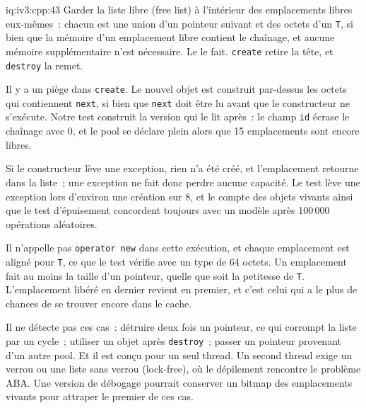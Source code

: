 \begin{solution}{iq:iv3:cpp:43}
Garder la liste libre (free list) à l'intérieur des emplacements libres eux-mêmes~: chacun est une union d'un pointeur suivant et des octets d'un \texttt{T}, si bien que la mémoire d'un emplacement libre contient le chaînage, et aucune mémoire supplémentaire n'est nécessaire. Le  le fait. \texttt{create} retire la tête, et \texttt{destroy} la remet.
\label{lst:iv3:cp:pool}

Il y a un piège dans \texttt{create}. Le nouvel objet est construit par-dessus les octets qui contiennent \texttt{next}, si bien que \texttt{next} doit être lu avant que le constructeur ne s'exécute. Notre test construit la version qui le lit après~: le champ \texttt{id} écrase le chaînage avec 0, et le pool se déclare plein alors que 15 emplacements sont encore libres.

Si le constructeur lève une exception, rien n'a été créé, et l'emplacement retourne dans la liste~; une exception ne fait donc perdre aucune capacité. Le test lève une exception lors d'environ une création sur 8, et le compte des objets vivants ainsi que le test d'épuisement concordent toujours avec un modèle après 100\,000 opérations aléatoires.

Il n'appelle pas \texttt{operator new} dans cette exécution, et chaque emplacement est aligné pour \texttt{T}, ce que le test vérifie avec un type de 64 octets. Un emplacement fait au moins la taille d'un pointeur, quelle que soit la petitesse de \texttt{T}. L'emplacement libéré en dernier revient en premier, et c'est celui qui a le plus de chances de se trouver encore dans le cache.

Il ne détecte pas ces cas~: détruire deux fois un pointeur, ce qui corrompt la liste par un cycle~; utiliser un objet après \texttt{destroy}~; passer un pointeur provenant d'un autre pool. Et il est conçu pour un seul thread. Un second thread exige un verrou ou une liste sans verrou (lock-free), où le dépilement rencontre le problème ABA. Une version de débogage pourrait conserver un bitmap des emplacements vivants pour attraper le premier de ces cas.

\end{solution}

